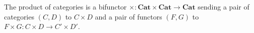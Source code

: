 The product of categories is a bifunctor $\times: \mathbf{Cat} \times \mathbf{Cat} \to \mathbf{Cat}$ sending a pair of categories $(C, D)$ to $C \times D$ and a pair of functors $(F, G)$ to $F \times G: C \times D \to C' \times D'$.
